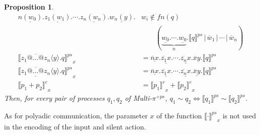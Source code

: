 \documentclass[submission,copyright,creativecommons]{eptcs}
\newcommand{\para}{\mbox{$\,|\,$}}
\newcommand{\encoding}[2]{\ensuremath{\llbracket #2 \rrbracket^{#1}}}
\newtheorem{aproposition}[adefinition]{Proposition}
\newenvironment{proposition}{\begin{aproposition}}{\end{aproposition}}
\begin{document}
\begin{proposition}
\begin{align*}
\underline{n(w_0)}.\underline{z_1(w_1)}. \cdots . \underline{z_n(w_n)}.\underline{w_n(y)}.  & w_i \notin fn(q) \\
   & \qquad (\underbrace{\underline{w_0}. \cdots . \underline{w_0}}_{n}.\encoding {ps} q \para \overline w_1 \para \cdots \para \overline w_n )  \\
\encoding {ps} { \overline {z_1@\ldots@z_n} \langle y \rangle .q }_x  &= 
\underline{\overline {n} x}.\underline{\overline {z_1} x}. \cdots . \underline{\overline {z_n} x}. \overline{x} y. \encoding {ps} q \\
\encoding {ps} { \underline {\overline {z_1@\ldots@z_n}} \langle y \rangle  .q }_x  &= 
\underline{\overline {n} x}.\underline{\overline {z_1} x}. \cdots . \underline{\overline {z_n} x}. \underline{\overline{x} y}. \encoding {ps} q \\
\encoding c { p_1 + p_2 }_x &= \encoding c {p_1}_x + \encoding c {p_2}_x  
\end{align*}
Then, for every pair of processes $q_1, q_2$ of Multi-$\pi^{+ps}$, $q_1 \sim q_2 \iff \encoding {ps} {q_1} \sim \encoding {ps} {q_2} $.
\end{proposition}

As for polyadic communication, the parameter $x$ of the function $\encoding {ps} \cdot _x$ is not used in the encoding of the 
input and silent action.


\end{document}
